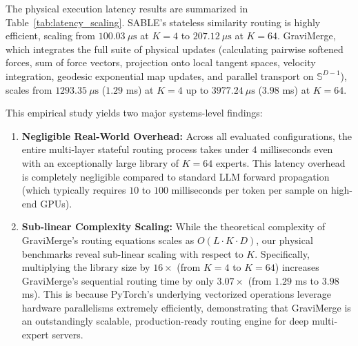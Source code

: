 The physical execution latency results are summarized in Table~\ref{tab:latency_scaling}. SABLE's stateless similarity routing is highly efficient, scaling from $100.03\ \mu\text{s}$ at $K = 4$ to $207.12\ \mu\text{s}$ at $K = 64$. GraviMerge, which integrates the full suite of physical updates (calculating pairwise softened forces, sum of force vectors, projection onto local tangent spaces, velocity integration, geodesic exponential map updates, and parallel transport on $\mathbb{S}^{D-1}$), scales from $1293.35\ \mu\text{s}$ ($1.29$ ms) at $K = 4$ up to $3977.24\ \mu\text{s}$ ($3.98$ ms) at $K = 64$.

This empirical study yields two major systems-level findings:
\begin{enumerate}
    \item \textbf{Negligible Real-World Overhead: } Across all evaluated configurations, the entire multi-layer stateful routing process takes under $4$ milliseconds even with an exceptionally large library of $K=64$ experts. This latency overhead is completely negligible compared to standard LLM forward propagation (which typically requires $10$ to $100$ milliseconds per token per sample on high-end GPUs).
    \item \textbf{Sub-linear Complexity Scaling: } While the theoretical complexity of GraviMerge's routing equations scales as $O(L \cdot K \cdot D)$, our physical benchmarks reveal sub-linear scaling with respect to $K$. Specifically, multiplying the library size by $16\times$ (from $K=4$ to $K=64$) increases GraviMerge's sequential routing time by only $3.07\times$ (from $1.29$ ms to $3.98$ ms). This is because PyTorch's underlying vectorized operations leverage hardware parallelisms extremely efficiently, demonstrating that GraviMerge is an outstandingly scalable, production-ready routing engine for deep multi-expert servers.
\end{enumerate}

